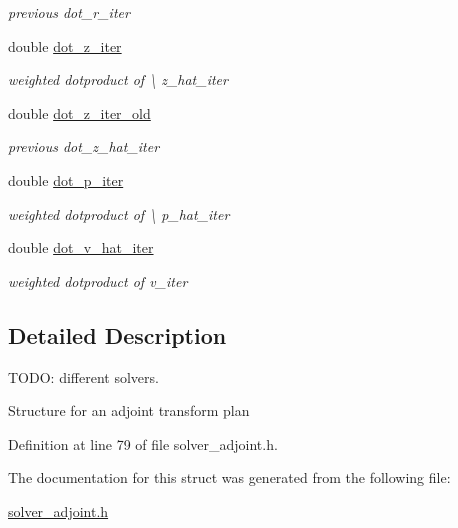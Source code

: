 \begin{DoxyCompactItemize}
\begin{DoxyCompactList}\small\item\em previous dot\-\_\-r\-\_\-iter \end{DoxyCompactList}\item 
\hypertarget{structinfsft__adjoint__plan_ad854541f2e09bc978461fff1c323b2a5}{double \hyperlink{structinfsft__adjoint__plan_ad854541f2e09bc978461fff1c323b2a5}{dot\-\_\-z\-\_\-iter}}\label{structinfsft__adjoint__plan_ad854541f2e09bc978461fff1c323b2a5}

\begin{DoxyCompactList}\small\item\em weighted dotproduct of \textbackslash{} z\-\_\-hat\-\_\-iter \end{DoxyCompactList}\item 
\hypertarget{structinfsft__adjoint__plan_a681a3587b2e42a24f03bac812eb7a60e}{double \hyperlink{structinfsft__adjoint__plan_a681a3587b2e42a24f03bac812eb7a60e}{dot\-\_\-z\-\_\-iter\-\_\-old}}\label{structinfsft__adjoint__plan_a681a3587b2e42a24f03bac812eb7a60e}

\begin{DoxyCompactList}\small\item\em previous dot\-\_\-z\-\_\-hat\-\_\-iter \end{DoxyCompactList}\item 
\hypertarget{structinfsft__adjoint__plan_a108504616c4e19b53638a80710f9308c}{double \hyperlink{structinfsft__adjoint__plan_a108504616c4e19b53638a80710f9308c}{dot\-\_\-p\-\_\-iter}}\label{structinfsft__adjoint__plan_a108504616c4e19b53638a80710f9308c}

\begin{DoxyCompactList}\small\item\em weighted dotproduct of \textbackslash{} p\-\_\-hat\-\_\-iter \end{DoxyCompactList}\item 
\hypertarget{structinfsft__adjoint__plan_a990b893dd142cbc3ade6436bdd603e59}{double \hyperlink{structinfsft__adjoint__plan_a990b893dd142cbc3ade6436bdd603e59}{dot\-\_\-v\-\_\-hat\-\_\-iter}}\label{structinfsft__adjoint__plan_a990b893dd142cbc3ade6436bdd603e59}

\begin{DoxyCompactList}\small\item\em weighted dotproduct of v\-\_\-iter \end{DoxyCompactList}\end{DoxyCompactItemize}


\subsection{Detailed Description}
T\-O\-D\-O\-: different solvers. 

Structure for an adjoint transform plan 

Definition at line 79 of file solver\-\_\-adjoint.\-h.



The documentation for this struct was generated from the following file\-:\begin{DoxyCompactItemize}
\item 
\hyperlink{solver__adjoint_8h}{solver\-\_\-adjoint.\-h}\end{DoxyCompactItemize}
